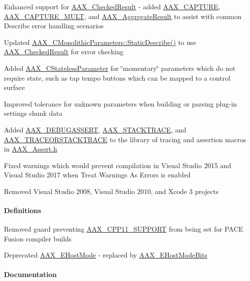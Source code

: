 \begin{DoxyItemize}
\item Enhanced support for \hyperlink{a00019}{A\+A\+X\+\_\+\+Checked\+Result} -\/ added \hyperlink{a00208_af9972551e4546e894010f99eade68c94}{A\+A\+X\+\_\+\+C\+A\+P\+T\+U\+R\+E}, \hyperlink{a00208_a078be92d3d19a5a4b3da2b55ae5ac1c9}{A\+A\+X\+\_\+\+C\+A\+P\+T\+U\+R\+E\+\_\+\+M\+U\+L\+T}, and \hyperlink{a00009}{A\+A\+X\+\_\+\+Aggregate\+Result} to assist with common Describe error handling scenarios  
\item Updated \hyperlink{a00026_a69f9b80a70ecc6b7b2a7eec372d2502a}{A\+A\+X\+\_\+\+C\+Monolithic\+Parameters\+::\+Static\+Describe()} to use \hyperlink{a00019}{A\+A\+X\+\_\+\+Checked\+Result} for error checking  
\item Added \hyperlink{a00040}{A\+A\+X\+\_\+\+C\+Stateless\+Parameter} for \char`\"{}momentary\char`\"{} parameters which do not require state, such as tap tempo buttons which can be mapped to a control surface  
\item Improved tolerance for unknown parameters when building or parsing plug-\/in settings chunk data  
\item Added \hyperlink{a00158_aa0253bd2994036fcfd6629ecf465d543}{A\+A\+X\+\_\+\+D\+E\+B\+U\+G\+A\+S\+S\+E\+R\+T}, \hyperlink{a00158_ae871829dd7297e4a5ae6c7094f6b5398}{A\+A\+X\+\_\+\+S\+T\+A\+C\+K\+T\+R\+A\+C\+E}, and \hyperlink{a00158_a96862f9cb28b6a49eb5dbd6da9975ed1}{A\+A\+X\+\_\+\+T\+R\+A\+C\+E\+O\+R\+S\+T\+A\+C\+K\+T\+R\+A\+C\+E} to the library of tracing and assertion macros in \hyperlink{a00158}{A\+A\+X\+\_\+\+Assert.\+h}  
\item Fixed warnings which would prevent compilation in Visual Studio 2015 and Visual Studio 2017 when Treat Warnings As Errors is enabled  
\item Removed Visual Studio 2008, Visual Studio 2010, and Xcode 3 projects  
\end{DoxyItemize}\hypertarget{a00375_aax_sdk_2p3p1_Definitions}{}\paragraph{Definitions}\label{a00375_aax_sdk_2p3p1_Definitions}

\begin{DoxyItemize}
\item Removed guard preventing \hyperlink{a00149_a2da185ff8aad77278f985a6fe5ee07ba}{A\+A\+X\+\_\+\+C\+P\+P11\+\_\+\+S\+U\+P\+P\+O\+R\+T} from being set for P\+A\+C\+E Fusion compiler builds  
\item Deprecated \hyperlink{a00206_af7d77416967955e258539694870f395a}{A\+A\+X\+\_\+\+E\+Host\+Mode} -\/ replaced by \hyperlink{a00206_aa3c8056a6ce601cc3367cb7d4478e9da}{A\+A\+X\+\_\+\+E\+Host\+Mode\+Bits}  
\end{DoxyItemize}\hypertarget{a00375_aax_sdk_2p3p1_Documentation}{}\paragraph{Documentation}\label{a00375_aax_sdk_2p3p1_Documentation}

